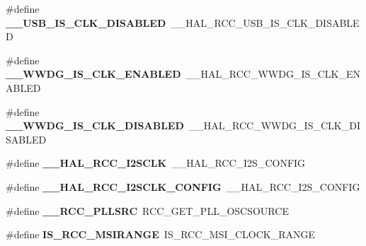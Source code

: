\begin{DoxyCompactItemize}
\item 
\hypertarget{group___h_a_l___r_c_c___aliased_ga85b0605d36fd5aa803d746eca015176f}{\#define {\bfseries \-\_\-\-\_\-\-U\-S\-B\-\_\-\-I\-S\-\_\-\-C\-L\-K\-\_\-\-D\-I\-S\-A\-B\-L\-E\-D}~\-\_\-\-\_\-\-H\-A\-L\-\_\-\-R\-C\-C\-\_\-\-U\-S\-B\-\_\-\-I\-S\-\_\-\-C\-L\-K\-\_\-\-D\-I\-S\-A\-B\-L\-E\-D}\label{group___h_a_l___r_c_c___aliased_ga85b0605d36fd5aa803d746eca015176f}

\item 
\hypertarget{group___h_a_l___r_c_c___aliased_gabf1f0e44cf619dc56ee9cf091be090f6}{\#define {\bfseries \-\_\-\-\_\-\-W\-W\-D\-G\-\_\-\-I\-S\-\_\-\-C\-L\-K\-\_\-\-E\-N\-A\-B\-L\-E\-D}~\-\_\-\-\_\-\-H\-A\-L\-\_\-\-R\-C\-C\-\_\-\-W\-W\-D\-G\-\_\-\-I\-S\-\_\-\-C\-L\-K\-\_\-\-E\-N\-A\-B\-L\-E\-D}\label{group___h_a_l___r_c_c___aliased_gabf1f0e44cf619dc56ee9cf091be090f6}

\item 
\hypertarget{group___h_a_l___r_c_c___aliased_ga15d27ad70f9cc20c8a51b4e9eab77349}{\#define {\bfseries \-\_\-\-\_\-\-W\-W\-D\-G\-\_\-\-I\-S\-\_\-\-C\-L\-K\-\_\-\-D\-I\-S\-A\-B\-L\-E\-D}~\-\_\-\-\_\-\-H\-A\-L\-\_\-\-R\-C\-C\-\_\-\-W\-W\-D\-G\-\_\-\-I\-S\-\_\-\-C\-L\-K\-\_\-\-D\-I\-S\-A\-B\-L\-E\-D}\label{group___h_a_l___r_c_c___aliased_ga15d27ad70f9cc20c8a51b4e9eab77349}

\item 
\hypertarget{group___h_a_l___r_c_c___aliased_ga6b96f4a2f2c7dc9219b24883e8bea223}{\#define {\bfseries \-\_\-\-\_\-\-H\-A\-L\-\_\-\-R\-C\-C\-\_\-\-I2\-S\-C\-L\-K}~\-\_\-\-\_\-\-H\-A\-L\-\_\-\-R\-C\-C\-\_\-\-I2\-S\-\_\-\-C\-O\-N\-F\-I\-G}\label{group___h_a_l___r_c_c___aliased_ga6b96f4a2f2c7dc9219b24883e8bea223}

\item 
\hypertarget{group___h_a_l___r_c_c___aliased_gadc772f9067a6f4591305fe7dc0603447}{\#define {\bfseries \-\_\-\-\_\-\-H\-A\-L\-\_\-\-R\-C\-C\-\_\-\-I2\-S\-C\-L\-K\-\_\-\-C\-O\-N\-F\-I\-G}~\-\_\-\-\_\-\-H\-A\-L\-\_\-\-R\-C\-C\-\_\-\-I2\-S\-\_\-\-C\-O\-N\-F\-I\-G}\label{group___h_a_l___r_c_c___aliased_gadc772f9067a6f4591305fe7dc0603447}

\item 
\hypertarget{group___h_a_l___r_c_c___aliased_ga181e9fea5e2a50d09d2b32f5ebf78794}{\#define {\bfseries \-\_\-\-\_\-\-R\-C\-C\-\_\-\-P\-L\-L\-S\-R\-C}~R\-C\-C\-\_\-\-G\-E\-T\-\_\-\-P\-L\-L\-\_\-\-O\-S\-C\-S\-O\-U\-R\-C\-E}\label{group___h_a_l___r_c_c___aliased_ga181e9fea5e2a50d09d2b32f5ebf78794}

\item 
\hypertarget{group___h_a_l___r_c_c___aliased_gad3f63ae7a859b8f5395aaf703ac72694}{\#define {\bfseries I\-S\-\_\-\-R\-C\-C\-\_\-\-M\-S\-I\-R\-A\-N\-G\-E}~I\-S\-\_\-\-R\-C\-C\-\_\-\-M\-S\-I\-\_\-\-C\-L\-O\-C\-K\-\_\-\-R\-A\-N\-G\-E}\label{group___h_a_l___r_c_c___aliased_gad3f63ae7a859b8f5395aaf703ac72694}


\end{DoxyCompactItemize}
